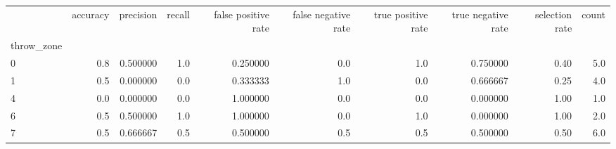 \begin{tabular}{lrrrrrrrrr}
\toprule
{} &  accuracy &  precision &  recall &  false positive rate &  false negative rate &  true positive rate &  true negative rate &  selection rate &  count \\
throw\_zone &           &            &         &                      &                      &                     &                     &                 &        \\
\midrule
0          &       0.8 &   0.500000 &     1.0 &             0.250000 &                  0.0 &                 1.0 &            0.750000 &            0.40 &    5.0 \\
1          &       0.5 &   0.000000 &     0.0 &             0.333333 &                  1.0 &                 0.0 &            0.666667 &            0.25 &    4.0 \\
4          &       0.0 &   0.000000 &     0.0 &             1.000000 &                  0.0 &                 0.0 &            0.000000 &            1.00 &    1.0 \\
6          &       0.5 &   0.500000 &     1.0 &             1.000000 &                  0.0 &                 1.0 &            0.000000 &            1.00 &    2.0 \\
7          &       0.5 &   0.666667 &     0.5 &             0.500000 &                  0.5 &                 0.5 &            0.500000 &            0.50 &    6.0 \\
\bottomrule
\end{tabular}
